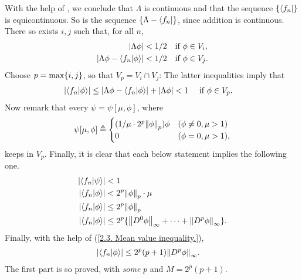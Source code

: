 %
With the help of , we conclude that %
%
  $\Lambda$ is continuous 
%
and that the sequence
%
  $\{\bra{f_n}\}$ %
%
is equicontinuous. 
%
So is the sequence %
%
  $\{\Lambda - \bra{f_n}\}$, %
%
since addition is continuous.
%
There so exists $i, j$ such that, for all $n$, 
%
  \begin{align}
    \left\lvert 
      \Lambda \phi 
    \right\rvert
      < 
    1/2 & \quad \text{if }\phi\in V_i, \\
    \left\lvert 
      \Lambda\phi - \bra{f_n}\ket{\phi} 
    \right\rvert  
      < 
    1/2 & \quad \text{if } \phi\in V_j.
  \end{align}
%
Choose $p = \max\{i, j\}$, so that $V_p = V_i \cap V_j$: %
The latter inequalities imply that %
%
  \begin{align}
    \left\lvert \bra{f_n}\ket{\phi} \right\rvert  & \leq 
      \magnitude{
        \Lambda\phi 
        - \bra{f_n }\ket{\phi} 
      }
      + 
      \magnitude{\Lambda \phi}
     < 1 \
       \quad\text{if } \phi\in V_p. %
  \end{align}
%
Now remark that every $\psi =\psi[\mu, \phi]$, where %
%
  \begin{align}
     \psi[\mu, \phi] \triangleq 
      \begin{cases}
        ({1}/{\mu \cdot 2^{p} \norm{\phi}_{p}}) \phi & (\phi \neq 0, \mu > 1)\\
        0                                          & (\phi   =  0, \mu > 1),  
      \end{cases}
  \end{align}
%
keeps in $V_p$. Finally, %
it is clear that each below statement implies the following one.
%
  \begin{align}
    \lvert \langle {f_n}  | \psi \rangle \rvert &  
    < 1 \\
    \left\lvert \bra{f_n}\ket{\phi} \right\rvert &  
    < 2^{p}  \norm{\phi}_{p} \cdot \mu \\
    \abs{\bra{f_n}\ket{\phi}} & 
    \leq 2^{p} \norm{\phi}_{p} \\
     \abs{\bra{f_n}\ket{\phi}} &
     \leq 2^{p} \{
       \norm{D^0 \phi}_{\infty} 
       + 
         \cdots 
      + 
        \norm{D^p \phi}_{\infty}
      \}.
  \end{align}
  Finally, with the help of (\ref{2.3. Mean value inequality.}), 
  \begin{align}
    \label{2.3. Bound with p and M (theoritical).}
     \abs{\bra{f_n}\ket{\phi}} &
       \leq 
      2^{p} (p+1) \norm{D^p \phi}_{\infty} .
  \end{align}
%
The first part is so proved, with \textit{some} $p$ and $ M= 2^{p}(p+1)$. %
\newline\newline\noindent
%
